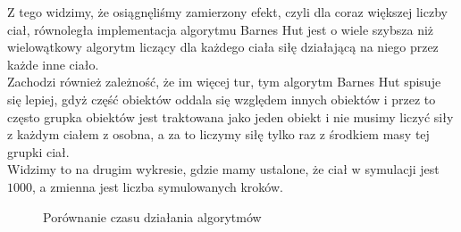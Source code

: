 \documentclass[14pt,twoside,a4paper]{article}
\theoremstyle{definition}
\begin{document}
Z tego widzimy, że osiągnęliśmy zamierzony efekt, czyli dla coraz większej liczby ciał, równoległa implementacja algorytmu Barnes Hut jest o wiele szybsza niż wielowątkowy algorytm liczący dla każdego ciała siłę działającą na niego przez każde inne ciało. \\
Zachodzi również zależność, że im więcej tur, tym algorytm Barnes Hut spisuje się lepiej, gdyż część obiektów oddala się względem innych obiektów i przez to często grupka obiektów jest traktowana jako jeden obiekt i nie musimy liczyć siły z każdym ciałem z osobna, a za to liczymy siłę tylko raz z środkiem masy tej grupki ciał.\\
Widzimy to na drugim wykresie, gdzie mamy ustalone, że ciał w symulacji jest $1000$, a zmienna jest liczba symulowanych kroków.
\begin{figure}[h]
\caption{Porównanie czasu działania algorytmów}
\end{figure}


\nocite{*}
\printbibliography%
\end{document}
